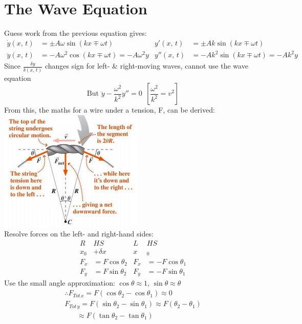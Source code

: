 \documentclass[a4paper, 11pt, fleqn, normalem]{report}
\begin{document}
\section{The Wave Equation}
Guess work from the previous equation gives:
\begin{align*}
    \dot{y}(x,\,t) &= \pm A{\omega}\sin{(kx \mp {\omega}t)}                 & y'(x,\,t) &= \pm Ak\sin{(kx \mp {\omega}t)} \\
    \ddot{y}(x,\,t) &= -A\omega^{2}\cos{(kx \mp {\omega}t)} = -A\omega^{2}y & y''(x,\,t) &= -Ak^{2}\sin{(kx \mp {\omega}t)} = -Ak^{2}y
\end{align*}
Since $\frac{\delta y}{\delta(x,\,t)}$ changes sign for left- \& right-moving waves, cannot use the wave equation
\begin{equation*}
    \text{But } \ddot{y} - \frac{\omega^{2}}{k^{2}}y'' = 0 ~~[\frac{\omega^{2}}{k^{2}} = v^{2}]
\end{equation*}
From this, the maths for a wire under a tension, F, can be derived:\\
\includegraphics{Tension.jpg} \\
Resolve forces on the left- and right-hand sides:
\begin{align*}
         R&HS                  &      L&HS                   \\
    x_{0} &+ {\delta}x         &      x&_{0}                 \\
    F_{x} &= F\cos{\theta_{2}} & F_{x} &= -F\cos{\theta_{1}} \\
    F_{y} &= F\sin{\theta_{2}} & F_{y} &= -F\sin{\theta_{1}}
\end{align*}
Use the small angle approximation: $\cos{\theta} \approx 1$, $\sin{\theta} \approx \theta$
\begin{gather*}
    \therefore F_{Tot\,x} = F(\cos{\theta_{2}} - \cos{\theta_{1}}) \approx 0 \\
    F_{Tot\,y} = F(\sin{\theta_{2}} - \sin{\theta_{1}}) \approx F(\theta_{2} - \theta_{1}) \\
    ~~~~~~~\,\approx F(\tan{\theta_{2}} - \tan{\theta_{1}})
\end{gather*}
\end{document}
